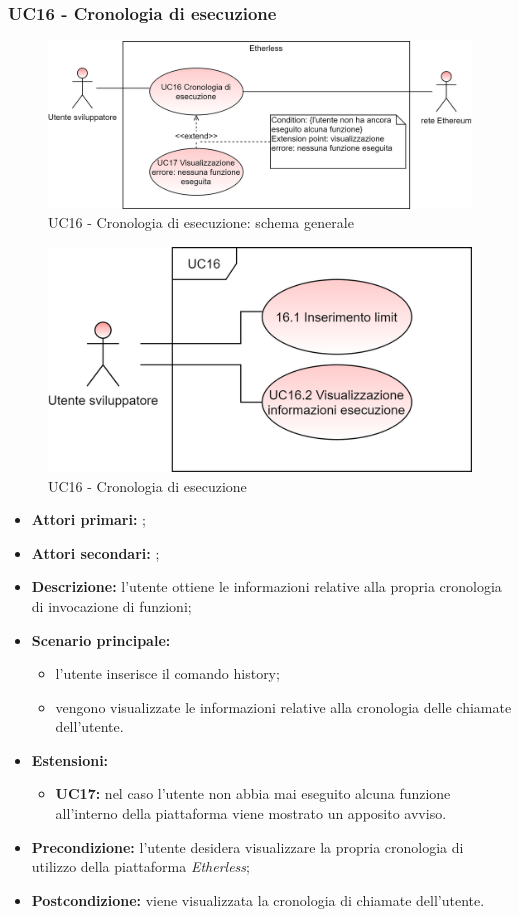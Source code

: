 \subsubsection{UC16 - Cronologia di esecuzione}
\begin{figure}[h]
	\centering
	\includegraphics[scale=\ucs]{./res/img/UC16G.png}
	\caption {UC16 - Cronologia di esecuzione: schema generale}
\end{figure}
\begin{figure}[h]
	\centering
	\includegraphics[scale=\ucs]{./res/img/UC16.png}
	\caption {UC16 - Cronologia di esecuzione}
\end{figure}
\begin{itemize}
	\item \textbf{Attori primari:} \us{};
	\item \textbf{Attori secondari:} \re{};
	\item \textbf{Descrizione:} l’utente ottiene le informazioni relative alla propria cronologia di invocazione di funzioni;
	\item \textbf{Scenario principale:} 
	\begin{itemize}
		\item l'utente inserisce il comando history;  
		\item vengono visualizzate le informazioni relative alla cronologia delle chiamate dell’utente.
	\end{itemize}
	\item \textbf{Estensioni:} 
	\begin{itemize}
		\item \textbf{UC17:} nel caso l’utente non abbia mai eseguito alcuna funzione all’interno della piattaforma viene mostrato un apposito avviso.  
	\end{itemize}
	\item \textbf{Precondizione:} l’utente desidera visualizzare la propria cronologia di utilizzo della piattaforma \textit{Etherless}; 
	\item \textbf{Postcondizione:} viene visualizzata la cronologia di chiamate dell’utente.  
\end{itemize}